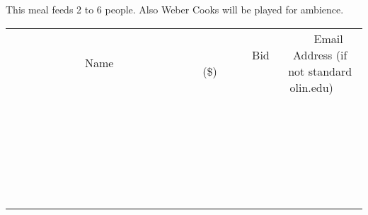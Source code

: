 \documentclass[11pt]{article}
\begin{document}
This meal feeds 2 to 6 people. Also Weber Cooks will be played for ambience. \\
					[6ex]
					\begin{tabular}{c c c}
						~~~~~~~~~~~~~Name~~~~~~~~~~~~~ & ~~~~~~~~~Bid (\$)~~~~~~~~~ & ~~~Email Address (if not standard olin.edu)~~~ \\
				
 & & \\
\hline
 & & \\
\hline
 & & \\
\hline
 & & \\
\hline
 & & \\
\hline
 & & \\
\hline
 & & \\
\hline
 & & \\
\hline
 & & \\
\hline
 & & \\
\hline
 & & \\
\hline
 & & \\
\hline
 & & \\
\hline
 & & \\
\hline
 & & \\
\hline
 & & \\
\hline
 & & \\
\hline
 & & \\
\hline
 & & \\
\hline
 & & \\
\hline
 & & \\
\hline
 & & \\
\hline
 & & \\
\hline
 & & \\
\hline
 & & \\
\hline
 & & \\
\hline
					\end{tabular}
					\clearpage
				
\end{document}
